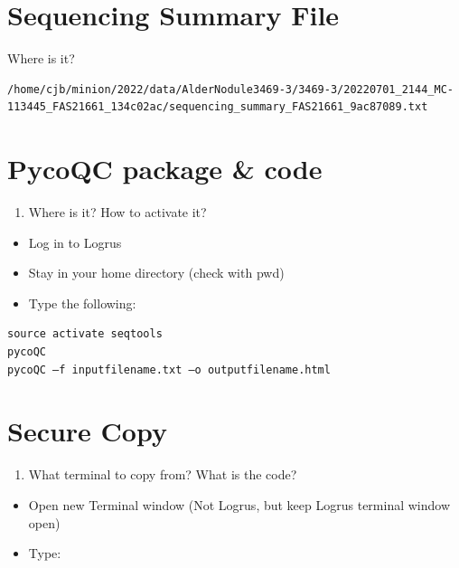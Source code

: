 \documentclass[
]{book}
\providecommand{\tightlist}{%
  \setlength{\itemsep}{0pt}\setlength{\parskip}{0pt}}
\begin{document}
\hypertarget{sequencing-summary-file}{%
\section{Sequencing Summary File}\label{sequencing-summary-file}}

Where is it?

\begin{verbatim}
/home/cjb/minion/2022/data/AlderNodule3469-3/3469-3/20220701_2144_MC-113445_FAS21661_134c02ac/sequencing_summary_FAS21661_9ac87089.txt
\end{verbatim}

\hypertarget{pycoqc-package-code}{%
\section{PycoQC package \& code}\label{pycoqc-package-code}}

\begin{enumerate}
\def\labelenumi{\arabic{enumi}.}
\tightlist
\item
  Where is it? How to activate it?
\end{enumerate}

\begin{itemize}
\tightlist
\item
  Log in to Logrus
\item
  Stay in your home directory (check with pwd)
\item
  Type the following:
\end{itemize}

\begin{verbatim}
source activate seqtools
pycoQC
pycoQC –f inputfilename.txt –o outputfilename.html
\end{verbatim}

\hypertarget{secure-copy}{%
\section{Secure Copy}\label{secure-copy}}

\begin{enumerate}
\def\labelenumi{\arabic{enumi}.}
\tightlist
\item
  What terminal to copy from? What is the code?
\end{enumerate}

\begin{itemize}
\tightlist
\item
  Open new Terminal window (Not Logrus, but keep Logrus terminal window open)\\
\item
  Type:
\end{itemize}
\end{document}
